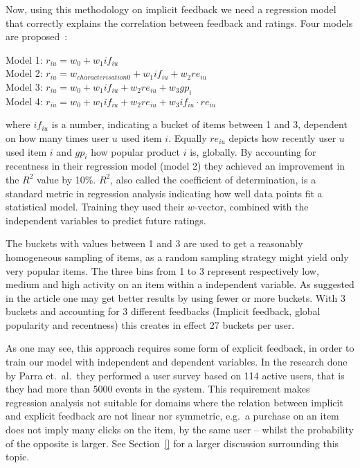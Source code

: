 Now, using this methodology on implicit feedback we need a regression model that
correctly explains the correlation between feedback and ratings. Four models
are proposed~\cite{parra2011walk}:

\noindent
Model 1: $r_{iu} = w_0 + w_1 if_{iu}$ \\
Model 2: $r_{iu} = w_{characterisation0} + w_1 if_{iu} + w_2 re_{iu}$ \\
Model 3: $r_{iu} = w_0 + w_1 if_{iu} + w_2 re_{iu} + w_3 gp_{i}$ \\
Model 4: $r_{iu} = w_0 + w_1 if_{iu} + w_2 re_{iu} + w_3 if_{iu} \cdot re_{iu}$

where $if_{iu}$ is a number, indicating a bucket of items between 1 and 3,
dependent on how many times user $u$ used item $i$. Equally $re_{iu}$ depicts
how recently user $u$ used item $i$ and $gp_{i}$ how popular product $i$ is,
globally. By accounting for recentness in their regression model (model 2)
they achieved an improvement in the $R^2$ value by 10\%. $R^2$, also called the
coefficient of determination, is a standard metric in regression analysis
indicating how well data points fit a statistical model. Training they used
their $w$-vector, combined with the independent variables to predict future
ratings.

The buckets with values between 1 and 3 are used to get a reasonably
homogeneous sampling of items, as a random sampling strategy might yield only
very popular items. The three bins from 1 to 3 represent respectively low,
medium and high activity on an item within a independent variable. As suggested
in the article one may get better results by using fewer or more buckets. With
3 buckets and accounting for 3 different feedbacks (Implicit feedback, global
popularity and recentness) this creates in effect 27 buckets per user.

As one may see, this approach requires some form of explicit feedback, in order
to train our model with independent and dependent variables. In the research
done by Parra et.\ al.\ they performed a user survey based on 114 active users,
that is they had more than 5000 events in the system. This requirement makes
regression analysis not suitable for domains where the relation between
implicit and explicit feedback are not linear nor symmetric, e.g.\ a purchase on
an item does not imply many clicks on the item, by the same user – whilst the
probability of the opposite is larger. See Section~\ref{} for a larger
discussion surrounding this topic. %

